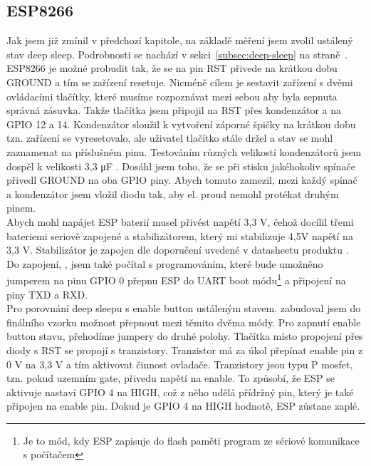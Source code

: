 \documentclass[a4paper, 12pt]{report}
\begin{document}
    \subsection{ESP8266}
    Jak jsem již zmínil v předchozí kapitole, na základě měření jsem zvolil ustálený stav deep sleep. Podrobnosti se nachází v sekci~\ref{subsec:deep-sleep} na straně~\pageref{subsec:deep-sleep}. ESP8266 je možné probudit tak, že se na pin RST přivede na krátkou dobu GROUND a tím se zařízení resetuje. Nicméně cílem je sestavit zařízení s dvěmi ovládacími tlačítky, které musíme rozpoznávat mezi sebou aby byla sepnuta správná zásuvka. Takže tlačítka jsem připojil na RST přes kondenzátor a na GPIO 12 a 14. Kondenzátor sloužil k vytvoření záporné špičky na krátkou dobu tzn. zařízení se vyresetovalo, ale uživatel tlačítko stále držel a stav se mohl zaznamenat na příslušném pinu. Testováním různých velikostí kondenzátorů jsem dospěl k velikosti 3,3 \si{\micro F} . Dosáhl jsem toho, že se při stisku jakéhokoliv spínače přivedl GROUND na oba GPIO piny. Abych tomuto zamezil, mezi každý spínač a kondenzátor jsem vložil diodu tak, aby el. proud nemohl protékat druhým pinem. \\
    Abych mohl napájet ESP baterií musel přivést napětí 3,3 \si{V}, čehož docílil třemi bateriemi seriově zapojené a stabilizátorem, který mi stabilizuje 4,5\si{V} napětí na 3,3 \si{V}. Stabilizátor je zapojen dle doporučení uvedené v datasheetu produktu .\\
    Do zapojení, , jsem také počítal s programováním, které bude umožněno jumperem na pinu GPIO 0 přepnu ESP do UART boot módu\footnote{Je to mód, kdy ESP zapisuje do flash paměti program ze sériové komunikace s počítačem} a připojení na piny TXD a RXD\@. \\
    Pro porovnání deep sleepu s enable button ustáleným stavem. zabudoval jsem do finálního vzorku možnost přepnout mezi těmito dvěma módy. Pro zapnutí enable button stavu, přehodíme jumpery do druhé polohy. Tlačítka místo propojení přes diody s RST se propojí s tranzistory. Tranzistor má za úkol přepínat enable pin z 0 V na 3,3 V a tím aktivovat činnost ovladače. Tranzistory jsou typu P mosfet, tzn. pokud uzemním gate, přivedu napětí na enable. To způsobí, že ESP se aktivuje nastaví GPIO 4 na HIGH, což z něho udělá přídržný pin, který je také připojen na enable pin. Dokud je GPIO 4 na HIGH hodnotě, ESP zůstane zaplé.
\end{document}
